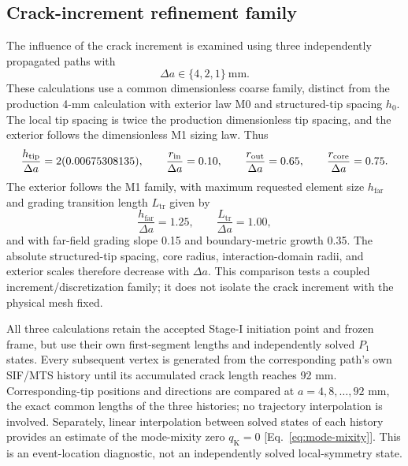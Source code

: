 \documentclass[11pt]{article}
\begin{document}
\subsection{Crack-increment refinement family}
The influence of the crack increment is examined using
three independently propagated paths with
\[
 \Delta a\in\{4,2,1\}\ \mathrm{mm}.
\]
These calculations use a common dimensionless coarse family,
distinct from the production 4-mm calculation with exterior law M0
and structured-tip spacing $h_0$. The local tip spacing is twice
the production dimensionless tip spacing, and the exterior follows
the dimensionless M1 sizing law. Thus
\begin{equation}
 \frac{h_{\rm tip}}{\Delta a}
 =2(0.00675308135),\qquad
 \frac{r_{\mathrm{in}}}{\Delta a}=0.10,\qquad
 \frac{r_{\mathrm{out}}}{\Delta a}=0.65,\qquad
 \frac{r_{\mathrm{core}}}{\Delta a}=0.75.
 \label{eq:increment-family}
\end{equation}
The exterior follows the M1 family, with maximum requested
element size $h_{\mathrm{far}}$ and grading transition length
$L_{\mathrm{tr}}$ given by
\[
 \frac{h_{\mathrm{far}}}{\Delta a}=1.25,\qquad
 \frac{L_{\mathrm{tr}}}{\Delta a}=1.00,
\]
and with far-field grading slope 0.15 and boundary-metric
growth 0.35. The absolute structured-tip spacing, core
radius, interaction-domain radii, and exterior scales
therefore decrease with $\Delta a$. This comparison tests a
coupled increment/discretization family; it does not isolate
the crack increment with the physical mesh fixed.

All three calculations retain the accepted Stage-I initiation point
and frozen frame, but use their own first-segment lengths and
independently solved $P_1$ states. Every subsequent vertex is
generated from the corresponding path's own SIF/MTS history
until its accumulated crack length reaches 92 mm.
Corresponding-tip positions and directions are compared at
$a=4,8,\ldots,92$ mm, the exact common lengths of the three
histories; no trajectory interpolation is involved. Separately,
linear interpolation between solved states of each history provides
an estimate of the mode-mixity zero
$q_{\mathrm{K}}=0$ [Eq.~\eqref{eq:mode-mixity}]. This is an
event-location diagnostic, not an independently solved
local-symmetry state.
\end{document}
